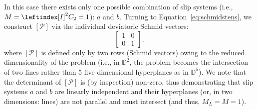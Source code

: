 \documentclass[preprint,3p,times,sort&compress,letterpaper,12pt]{elsarticle} %
\begin{document}
In this case there exists only one possible combination of slip systems (i.e., $M=\leftindex[I]^2 {C}_2=1$): $a$ and $b$. Turning to Equation~\ref{eq:schmidstens}, we construct $\left[\mathcal{P}\right]$ via the individual deviatoric Schmid vectors:
\begin{equation}
    \begin{bmatrix}
        1 & 0 \\
        0 & 1
    \end{bmatrix},
\end{equation}
where $\left[\mathcal{P}\right]$ is defined only by two rows (Schmid vectors) owing to the reduced dimensionality of the problem (i.e., in $\mathbb{D}^2$, the problem becomes the intersection of two lines rather than 5 five dimensional hyperplanes as in $\mathbb{D}^5$). We note that the determinant of $\left[\mathcal{P}\right]$ is (by inspection) non-zero, thus demonstrating that slip systems $a$ and $b$ are linearly independent and their hyperplanes (or, in two dimensions: lines) are not parallel and must intersect (and thus, $M_L=M=1$).
\end{document}
